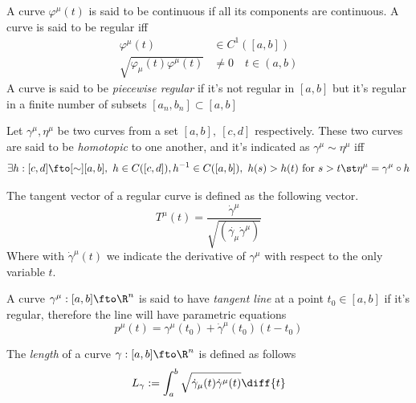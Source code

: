 \documentclass[../mmf.tex]{subfiles}
\begin{document}
\begin{dfn}
	A curve $\varphi^\mu(t)$ is said to be continuous if all its components are continuous. A curve is said to be regular iff
	\begin{equation}
		\begin{aligned}
			\varphi^\mu(t)&\in C^1([a,b])\\
			\sqrt{\varphi_\mu(t)\varphi^\mu(t)}&\ne0\quad t\in(a,b)
		\end{aligned}
		\label{eq:regularity}
	\end{equation}
	A curve is said to be \textit{piecewise regular} if it's not regular in $[a,b]$ but it's regular in a finite number of subsets $[a_n,b_n]\subset[a,b]$
\end{dfn}
\begin{dfn}
	Let $\gamma^\mu,\eta^\mu$ be two curves from a set $[a,b],\ [c,d]$ respectively. These two curves are said to be \textit{homotopic} to one another, and it's indicated as $\gamma^\mu\sim\eta^\mu$ iff
	\begin{equation}
		\exists h:[c,d]\fto[\sim][a,b],\ h\in C([c,d]),h^{-1}\in C([a,b]),\ h(s)>h(t)\text{ for }s>t\st\eta^\mu=\gamma^\mu\circ h
		\label{eq:homotopy}
	\end{equation}
\end{dfn}
\begin{dfn}
	The tangent vector of a regular curve is defined as the following vector.
	\begin{equation}
		T^\mu(t)=\frac{\dot{\gamma}^\mu}{\sqrt{(\dot{\gamma_\mu}\dot{\gamma}^\mu)}}
		\label{eq:tangentvector}
	\end{equation}
	Where with $\dot{\gamma}^\mu(t)$ we indicate the derivative of $\gamma^\mu$ with respect to the only variable $t$.
\end{dfn}
\begin{dfn}
	A curve $\gamma^\mu:[a,b]\fto\R^n$ is said to have \textit{tangent line} at a point $t_0\in[a,b]$ if it's regular, therefore the line will have parametric equations
	\begin{equation}
		p^\mu(t)=\gamma^\mu(t_0)+\dot{\gamma}^\mu(t_0)(t-t_0)
		\label{eq:curvetanline}
	\end{equation}
\end{dfn}
\begin{dfn}
	The \textit{length} of a curve $\gamma:[a,b]\fto\R^n$ is defined as follows
	\begin{equation}
		L_\gamma:=\int_{a}^{b}\sqrt{\dot{\gamma}_\mu(t)\dot{\gamma}^\mu(t)}\diff{t}
		\label{eq:lengthcurve}
	\end{equation}
\end{dfn}
\end{document}
